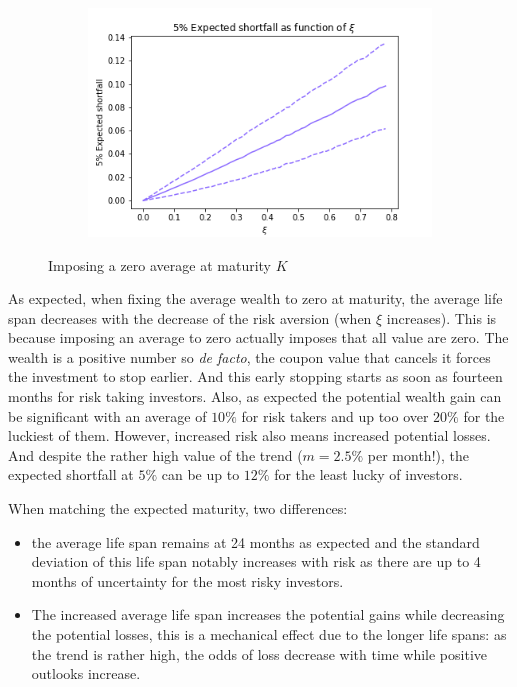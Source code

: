 \documentclass{article}
\begin{document}
\begin{figure}[b!]
\begin{subfigure}[b]{\textwidth}
     \end{subfigure}
     \\
     \begin{subfigure}[b]{\textwidth}
         \centering
         \includegraphics[scale=.7]{png/expected_shortfall__non_fixed_W0=1_r=0.005_m=0.02592451988463669_sigma=0.06164058158266796_K=24_S=100000.png}
         \caption{}
         \label{fig:average-final-wealth-zero-expected-shortfall}
     \end{subfigure}
        \caption{Imposing a zero average at maturity $K$}
        \label{fig:variable-maturity}
\end{figure}

As expected, when fixing the average wealth to zero at maturity, the average life span decreases with the decrease of the risk aversion (when $\xi$ increases). This is because imposing an average to zero actually imposes that all value are zero. The wealth is a positive number so \textit{de facto}, the coupon value that cancels it forces the investment to stop earlier. And this early stopping starts as soon as fourteen months for risk taking investors. Also, as expected the potential wealth gain can be significant with an average of $10\%$ for risk takers and up too over $20\%$ for the luckiest of them. However, increased risk also means increased potential losses. And despite the rather high value of the trend ($m = 2.5\%$ per month!), the expected shortfall at $5\%$ can be up to $12\%$ for the least lucky of investors.

When matching the expected maturity, two differences:
\begin{itemize}
\item the average life span remains at 24 months  as expected and the standard deviation of this life span notably increases with risk as there are up to 4 months of uncertainty for the most risky investors. 
\item The increased average life span increases the potential gains while decreasing the potential losses, this is a mechanical effect due to the longer life spans: as the trend is rather high, the odds of loss decrease with time while positive outlooks increase.
\end{itemize}
\end{document}
